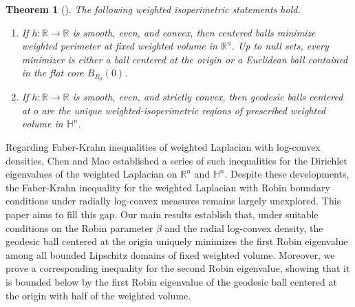 \documentclass[11pt,leqno]{amsart}
\newtheorem{theorem}{Theorem}[section]\newtheorem{thm}[theorem]{Theorem}
\def\R{\mathbb{R}}
\newcommand{\Hn}{\mathbb H}
\numberwithin{equation}{section}
\begin{document}
\begin{theorem}[\cite{ChamberJEMS, Silini24}]\label{thm:weighted-isoperimetry}
	The following weighted isoperimetric statements hold.
	\begin{enumerate}
		\item[\textup{(a)}]
		If \(h\colon\R\to\R\) is smooth, even, and convex, then centered
		balls minimize weighted perimeter at fixed weighted volume in
		\(\R^n\).  Up to null sets, every minimizer is either a ball centered
		at the origin or a Euclidean ball contained in the flat core
		\(B_{R_0}(0)\).
		\item[\textup{(b)}]
		If \(h\colon\R\to\R\) is smooth, even, and strictly convex, then
		geodesic balls centered at \(o\) are the unique weighted-isoperimetric
		regions of prescribed weighted volume in \(\Hn^n\).
	\end{enumerate}
\end{theorem}

Regarding Faber-Krahn  inequalities of weighted Laplacian with log-convex densities, Chen and Mao \cite{Maojing2025} established a series of such  inequalities for the Dirichlet eigenvalues of the weighted Laplacian on 
$\R^n$ and $\mathbb{H}^n$. Despite these developments, the Faber-Krahn inequality for the weighted Laplacian with Robin boundary conditions under radially log-convex measures remains largely unexplored. This paper aims to fill this gap. Our main results establish that, under suitable conditions on the Robin parameter $\beta$ and the radial log-convex density, the geodesic ball centered at the origin uniquely minimizes the first Robin eigenvalue among all bounded Lipschitz domains of fixed weighted volume. Moreover, we prove a corresponding inequality for the second Robin eigenvalue, showing that it is bounded below by the first Robin eigenvalue of the geodesic ball centered at the origin with half of the weighted volume.
\end{document}
